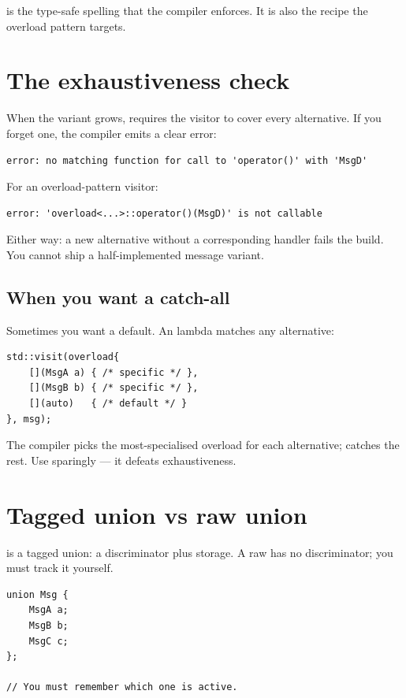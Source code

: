  is the type-safe spelling that the compiler
enforces. It is also the recipe the overload pattern targets.

\section{The exhaustiveness check}

When the variant grows,  requires the visitor
to cover every alternative. If you forget one, the compiler
emits a clear error:

\begin{lstlisting}
error: no matching function for call to 'operator()' with 'MsgD'
\end{lstlisting}

For an overload-pattern visitor:

\begin{lstlisting}
error: 'overload<...>::operator()(MsgD)' is not callable
\end{lstlisting}

Either way: a new alternative without a corresponding handler
fails the build. You cannot ship a half-implemented message
variant.

\subsection*{When you want a catch-all}

Sometimes you want a default. An  lambda matches any
alternative:

\begin{lstlisting}
std::visit(overload{
    [](MsgA a) { /* specific */ },
    [](MsgB b) { /* specific */ },
    [](auto)   { /* default */ }
}, msg);
\end{lstlisting}

The compiler picks the most-specialised overload for each
alternative;  catches the rest. Use sparingly ---
it defeats exhaustiveness.

\section{Tagged union vs raw union}

 is a tagged union: a discriminator plus
storage. A raw  has no discriminator; you must
track it yourself.

\begin{lstlisting}
union Msg {
    MsgA a;
    MsgB b;
    MsgC c;
};

// You must remember which one is active.
\end{lstlisting}

